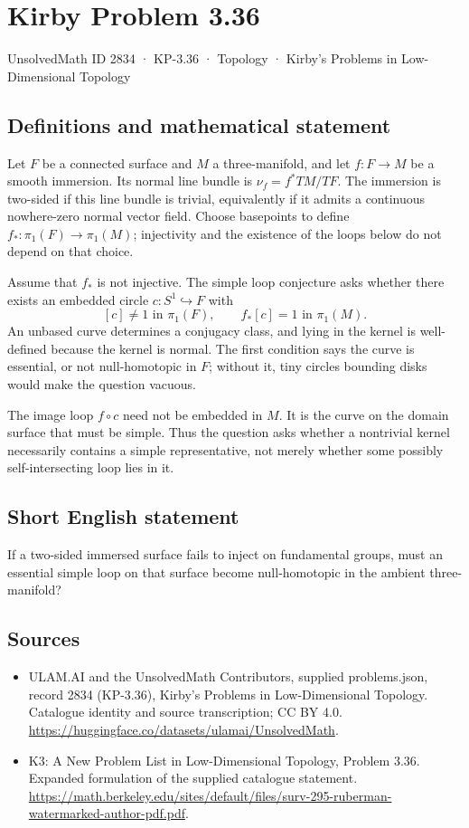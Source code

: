 \documentclass[11pt,a4paper]{article}
\begin{document}
\section*{Kirby Problem 3.36}\label{2834}
{\small UnsolvedMath ID 2834 · KP-3.36 · Topology · Kirby's Problems in Low-Dimensional Topology}
\subsection{Definitions and mathematical statement}
Let $F$ be a connected surface and $M$ a three-manifold, and let
$f:F\to M$ be a smooth immersion. Its normal line bundle is
$\nu_f=f^*TM/TF$. The immersion is two-sided if this line bundle is trivial,
equivalently if it admits a continuous nowhere-zero normal vector field.
Choose basepoints to define $f_*:\pi_1(F)\to\pi_1(M)$; injectivity and the
existence of the loops below do not depend on that choice.

Assume that $f_*$ is not injective. The simple loop conjecture asks whether
there exists an embedded circle $c:S^1\hookrightarrow F$ with
\[
 [c]\ne1\text{ in }\pi_1(F),\qquad
 f_*[c]=1\text{ in }\pi_1(M).
\]
An unbased curve determines a conjugacy class, and lying in the kernel is
well-defined because the kernel is normal. The first condition says the
curve is essential, or not null-homotopic in $F$; without it, tiny circles
bounding disks would make the question vacuous.

The image loop $f\circ c$ need not be embedded in $M$. It is the curve on
the domain surface that must be simple. Thus the question asks whether a
nontrivial kernel necessarily contains a simple representative, not merely
whether some possibly self-intersecting loop lies in it.
\subsection{Short English statement}
If a two-sided immersed surface fails to inject on fundamental groups, must an essential simple loop on that surface become null-homotopic in the ambient three-manifold?
\subsection{Sources}
\begin{itemize}
\item[S1] ULAM.AI and the UnsolvedMath Contributors, supplied problems.json, record 2834 (KP-3.36), Kirby's Problems in Low-Dimensional Topology. Catalogue identity and source transcription; CC BY 4.0.
\url{https://huggingface.co/datasets/ulamai/UnsolvedMath}.
\item[S2] K3: A New Problem List in Low-Dimensional Topology, Problem 3.36. Expanded formulation of the supplied catalogue statement.
\url{https://math.berkeley.edu/sites/default/files/surv-295-ruberman-watermarked-author-pdf.pdf}.
\end{itemize}
\end{document}
